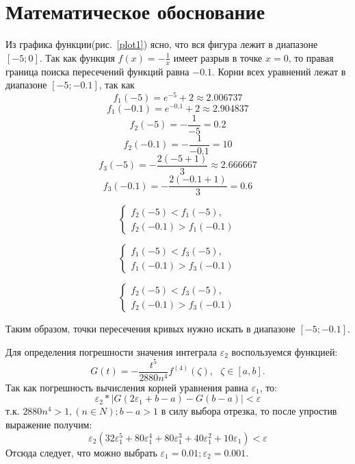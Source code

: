 \documentclass[a4paper,12pt,titlepage,finall]{article}
\begin{document}
\section{Математическое обоснование}

Из графика функции(рис.~\ref{plot1}) ясно, что вся фигура лежит в диапазоне $[-5; 0]$. Так как функция $f(x) = -\frac{1}{x}$ имеет разрыв в точке $x = 0$, то правая граница поиска пересечений функций равна $-0.1$. Корни всех уравнений лежат в диапазоне $[-5; -0.1]$, так как  
$$f_{1}(-5) = e^{-5}+2 \approx 2.006737 $$
$$f_{1}(-0.1) = e^{-0.1}+2 \approx 2.904837 $$
$$f_{2}(-5) = -\frac{1}{-5} = 0.2 $$
$$f_{2}(-0.1) = -\frac{1}{-0.1} = 10 $$
$$f_{3}(-5) = -\frac{2(-5+1)}{3} \approx 2.666667 $$
$$f_{3}(-0.1) = -\frac{2(-0.1+1)}{3} = 0.6 $$

\begin{equation}
 \begin{cases}
   f_{2}(-5) < f_{1}(-5), \\
   f_{2}(-0.1) > f_{1}(-0.1) 
 \end{cases}
\end{equation}

\begin{equation}
 \begin{cases}
   f_{1}(-5) < f_{3}(-5), \\
   f_{1}(-0.1) > f_{3}(-0.1) 
 \end{cases}
\end{equation}

\begin{equation}
 \begin{cases}
   f_{2}(-5) < f_{3}(-5), \\
   f_{2}(-0.1) > f_{3}(-0.1) 
 \end{cases}
\end{equation}

Таким образом, точки пересечения кривых нужно искать в диапазоне $[-5; -0.1]$.\par

Для определения погрешности значения интеграла $\varepsilon_2$ воспользуемся функцией:
$$G(t) = - \frac{t^5}{2880n^4}{{f^{(4)}(\zeta)}}, \ \ \ \zeta \in [a,b].$$
Так как погрешность вычисления корней уравнения равна $\varepsilon_1$, то:
$$\varepsilon_2*|G(2\varepsilon_1+b-a)-G(b-a)| < \varepsilon$$
т.к. $2880n^4 > 1, (n \in N); b-a > 1$ в силу выбора отрезка, то после упростив выражение получим: $$\varepsilon_2(32\varepsilon_1^5+80\varepsilon_1^4+80\varepsilon_1^3+40\varepsilon_1^2+10\varepsilon_1)<\varepsilon$$
Отсюда следует, что можно выбрать $\varepsilon_1 = 0.01; \varepsilon_2 = 0.001$.\par
\end{document}
